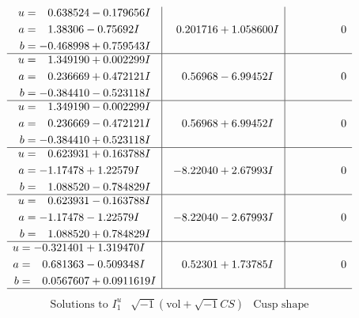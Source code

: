\documentclass[1p]{elsarticle_modified}
\theoremstyle{definition}
\newcommand{\I}{\sqrt{-1}}
\begin{document}
$$\begin{array}{c|c|c}
\begin{aligned}
u &= \phantom{-}0.638524 - 0.179656 I \\
a &= \phantom{-}1.38306 - 0.75692 I \\
b &= -0.468998 + 0.759543 I\end{aligned}
 & \phantom{-}0.201716 + 1.058600 I & \phantom{-0.000000 } 0 \\ \hline\begin{aligned}
u &= \phantom{-}1.349190 + 0.002299 I \\
a &= \phantom{-}0.236669 + 0.472121 I \\
b &= -0.384410 - 0.523118 I\end{aligned}
 & \phantom{-}0.56968 - 6.99452 I & \phantom{-0.000000 } 0 \\ \hline\begin{aligned}
u &= \phantom{-}1.349190 - 0.002299 I \\
a &= \phantom{-}0.236669 - 0.472121 I \\
b &= -0.384410 + 0.523118 I\end{aligned}
 & \phantom{-}0.56968 + 6.99452 I & \phantom{-0.000000 } 0 \\ \hline\begin{aligned}
u &= \phantom{-}0.623931 + 0.163788 I \\
a &= -1.17478 + 1.22579 I \\
b &= \phantom{-}1.088520 - 0.784829 I\end{aligned}
 & -8.22040 + 2.67993 I & \phantom{-0.000000 } 0 \\ \hline\begin{aligned}
u &= \phantom{-}0.623931 - 0.163788 I \\
a &= -1.17478 - 1.22579 I \\
b &= \phantom{-}1.088520 + 0.784829 I\end{aligned}
 & -8.22040 - 2.67993 I & \phantom{-0.000000 } 0 \\ \hline\begin{aligned}
u &= -0.321401 + 1.319470 I \\
a &= \phantom{-}0.681363 - 0.509348 I \\
b &= \phantom{-}0.0567607 + 0.0911619 I\end{aligned}
 & \phantom{-}0.52301 + 1.73785 I & \phantom{-0.000000 } 0\\
 \hline 
 \end{array}$$\newpage$$\begin{array}{c|c|c}  
\text{Solutions to }I^u_{1}& \I (\text{vol} + \sqrt{-1}CS) & \text{Cusp shape}\\

\end{array}$$
\end{document}
